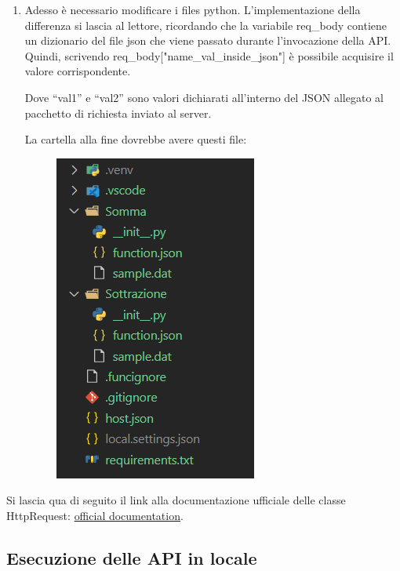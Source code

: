 \documentclass[a4paper]{article}
\newcommand{\dquotes}[1]{``#1''}
\begin{document}
\begin{enumerate}
		\item Adesso è necessario modificare i files python. L'implementazione della differenza si lascia al lettore, ricordando che la variabile \textsf{req\_body} contiene un dizionario del file json che viene passato durante l'invocazione della API. Quindi, scrivendo \textsf{req\_body["name\_val\_inside\_json"]} è possibile acquisire il valore corrispondente.
		\newpage
		
		\noindent
		Dove \dquotes{\textsf{val1}} e \dquotes{\textsf{val2}} sono valori dichiarati all'interno del JSON allegato al pacchetto di richiesta inviato al server.
		
		La cartella alla fine dovrebbe avere questi file:
		\begin{figure}[!htp]
			\centering
			\includegraphics[width=.4\textwidth]{img/azure-3.png}
		\end{figure}
	\end{enumerate}
	Si lascia qua di seguito il link alla documentazione ufficiale delle classe \textsf{HttpRequest}: \href{https://learn.microsoft.com/en-us/python/api/azure-functions/azure.functions.httprequest?view=azure-python}{official documentation}.
	\newpage
	
	\subsection{Esecuzione delle API in locale}
	
\end{document}
